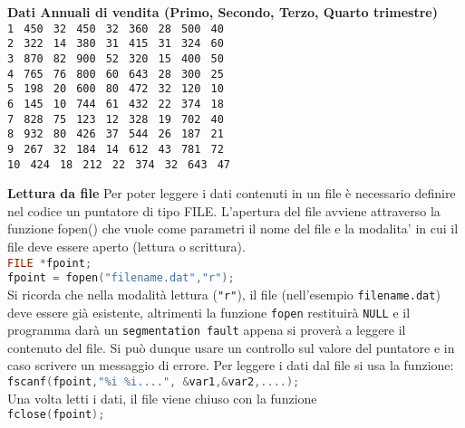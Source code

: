 \documentclass[11pt]{article}
\begin{document}
\begin{mdframed}[backgroundcolor=panna]
{\bf Dati Annuali di vendita (Primo, Secondo, Terzo, Quarto trimestre)}
\\
\texttt{1$\;$	450$\;$	32$\;$	450$\;$             32$\;$       360$\;$         28$\;$            500$\;$        40 \\
           2$\;$	322$\;$	14$\;$ 	380$\;$             31$\;$        415$\;$         31$\;$            324$\;$        60 \\
           3$\;$      870$\;$	82$\;$ 	900$\;$             52$\;$        320$\;$         15$\;$            400$\;$        50\\
           4$\;$      765$\;$	76$\;$ 	800$\;$             60$\;$        643$\;$         28$\;$            300$\;$        25\\
           5$\;$      198$\;$ 	20$\;$ 	600$\;$             80$\;$        472$\;$         32$\;$            120$\;$        10\\
           6$\;$      145$\;$	10$\;$ 	744$\;$             61$\;$        432$\;$         22$\;$            374$\;$        18\\ 
           7$\;$       828$\;$	75$\;$	123$\;$             12$\;$        328$\;$         19$\;$            702$\;$        40\\ 
           8$\;$       932$\;$	80$\;$	426$\;$             37$\;$        544$\;$         26$\;$            187$\;$        21\\
           9$\;$       267$\;$	32$\;$	184$\;$             14$\;$        612$\;$         43$\;$            781$\;$        72\\
           10$\;$	 424$\;$	18$\;$	212$\;$		22$\;$        374$\;$         32$\;$            643$\;$        47}
\end{mdframed}
 
 \begin{mdframed}[backgroundcolor=panna]
 {\bf Lettura da file}
 Per poter leggere i dati contenuti in un file \`{e} necessario definire nel codice un puntatore di tipo FILE. L'apertura del file avviene attraverso la funzione fopen() che vuole come parametri il nome del file e la modalita' in cui il file deve essere aperto (lettura o scrittura).\\
 \lstinline[language=c]!FILE *fpoint;!\\
 \lstinline[language=c]!fpoint = fopen("filename.dat","r");!\\
Si ricorda che nella modalit\`{a} lettura (\texttt{"r"}), il file (nell'esempio \texttt{filename.dat}) deve essere gi\`{a} esistente, altrimenti la funzione  \lstinline[language=c]!fopen! restituir\`{a}  \lstinline[language=c]!NULL! e il programma dar\`{a} un \texttt{segmentation fault} appena si prover\`{a} a leggere il contenuto del file. Si pu\`{o} dunque usare un controllo sul valore del puntatore e in caso scrivere un messaggio di errore. Per leggere i dati dal file si usa  la funzione:\\
\lstinline[language=c]!fscanf(fpoint,"%i %i....", &var1,&var2,....);! \\
Una volta letti i dati, il file viene chiuso con la funzione\\
\lstinline[language=c]!fclose(fpoint);!
 \end{mdframed}
 
\end{document}
